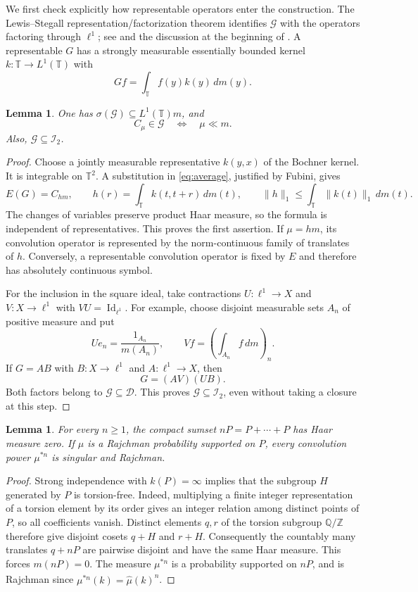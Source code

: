 \documentclass[11pt,reqno]{amsart}
\newtheorem{lemma}[theorem]{Lemma}
\theoremstyle{definition}
\theoremstyle{remark}
\newcommand{\T}{\mathbb T}
\newcommand{\D}{\mathcal D}
\newcommand{\G}{\mathcal G}
\newcommand{\I}{\mathcal I}
\newcommand{\Id}{\operatorname{Id}}
\begin{document}
We first check explicitly how representable operators enter the construction. The Lewis--Stegall representation/factorization theorem identifies $\G$ with the operators factoring through $\ell^1$; see \cite{DU} and the discussion at the beginning of \cite[Section~3]{JS}. A representable $G$ has a strongly measurable essentially bounded kernel $k:\T\to L^1(\T)$ with
\[
 Gf=\int_\T f(y)k(y)\,dm(y).
\]

\begin{lemma}\label{lem:representable}
One has $\sigma(\G)\subseteq L^1(\T)m$, and
\[
 C_\mu\in\G\quad\Longleftrightarrow\quad\mu\ll m.
\]
Also, $\G\subseteq\I_2$.
\end{lemma}
\begin{proof}
Choose a jointly measurable representative $k(y,x)$ of the Bochner kernel. It is integrable on $\T^2$. A substitution in \eqref{eq:average}, justified by Fubini, gives
\[
 E(G)=C_{hm},\qquad h(r)=\int_\T k(t,t+r)\,dm(t),
 \qquad \|h\|_1\leq\int_\T\|k(t)\|_1\,dm(t).
\]
The changes of variables preserve product Haar measure, so the formula is independent of representatives. This proves the first assertion. If $\mu=hm$, its convolution operator is represented by the norm-continuous family of translates of $h$. Conversely, a representable convolution operator is fixed by $E$ and therefore has absolutely continuous symbol.

For the inclusion in the square ideal, take contractions $U:\ell^1\to X$ and $V:X\to\ell^1$ with $VU=\Id_{\ell^1}$. For example, choose disjoint measurable sets $A_n$ of positive measure and put
\[
 Ue_n=\frac{1_{A_n}}{m(A_n)},\qquad Vf=\left(\int_{A_n}f\,dm\right)_n.
\]
If $G=AB$ with $B:X\to\ell^1$ and $A:\ell^1\to X$, then
\[
 G=(AV)(UB).
\]
Both factors belong to $\G\subseteq\D$. This proves $\G\subseteq\I_2$, even without taking a closure at this step.
\end{proof}

\begin{lemma}\label{lem:powers}
For every $n\geq1$, the compact sumset $nP=P+\cdots+P$ has Haar measure zero. If $\mu$ is a Rajchman probability supported on $P$, every convolution power $\mu^{*n}$ is singular and Rajchman.
\end{lemma}
\begin{proof}
Strong independence with $k(P)=\infty$ implies that the subgroup $H$ generated by $P$ is torsion-free. Indeed, multiplying a finite integer representation of a torsion element by its order gives an integer relation among distinct points of $P$, so all coefficients vanish. Distinct elements $q,r$ of the torsion subgroup $\mathbb Q/\mathbb Z$ therefore give disjoint cosets $q+H$ and $r+H$. Consequently the countably many translates $q+nP$ are pairwise disjoint and have the same Haar measure. This forces $m(nP)=0$. The measure $\mu^{*n}$ is a probability supported on $nP$, and is Rajchman since $\widehat{\mu^{*n}}(k)=\widehat\mu(k)^n$.
\end{proof}
\end{document}
